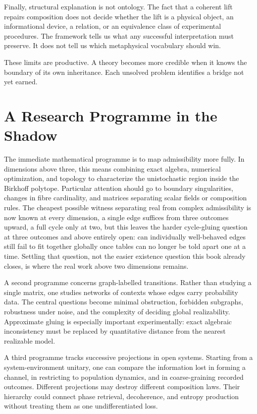 \documentclass[12pt,openany]{book}
\begin{document}
Finally, structural explanation is not ontology. The fact that a coherent lift repairs composition does not decide whether the lift is a physical object, an informational device, a relation, or an equivalence class of experimental procedures. The framework tells us what any successful interpretation must preserve. It does not tell us which metaphysical vocabulary should win.

These limits are productive. A theory becomes more credible when it knows the boundary of its own inheritance. Each unsolved problem identifies a bridge not yet earned.

\chapter{A Research Programme in the Shadow}
The immediate mathematical programme is to map admissibility more fully. In dimensions above three, this means combining exact algebra, numerical optimization, and topology to characterize the unistochastic region inside the Birkhoff polytope. Particular attention should go to boundary singularities, changes in fibre cardinality, and matrices separating scalar fields or composition rules. The cheapest possible witness separating real from complex admissibility is now known at every dimension, a single edge suffices from three outcomes upward, a full cycle only at two, but this leaves the harder cycle-gluing question at three outcomes and above entirely open: can individually well-behaved edges still fail to fit together globally once tables can no longer be told apart one at a time. Settling that question, not the easier existence question this book already closes, is where the real work above two dimensions remains.

A second programme concerns graph-labelled transitions. Rather than studying a single matrix, one studies networks of contexts whose edges carry probability data. The central questions become minimal obstruction, forbidden subgraphs, robustness under noise, and the complexity of deciding global realizability. Approximate gluing is especially important experimentally: exact algebraic inconsistency must be replaced by quantitative distance from the nearest realizable model.

A third programme tracks successive projections in open systems. Starting from a system-environment unitary, one can compare the information lost in forming a channel, in restricting to population dynamics, and in coarse-graining recorded outcomes. Different projections may destroy different composition laws. Their hierarchy could connect phase retrieval, decoherence, and entropy production without treating them as one undifferentiated loss.
\end{document}
